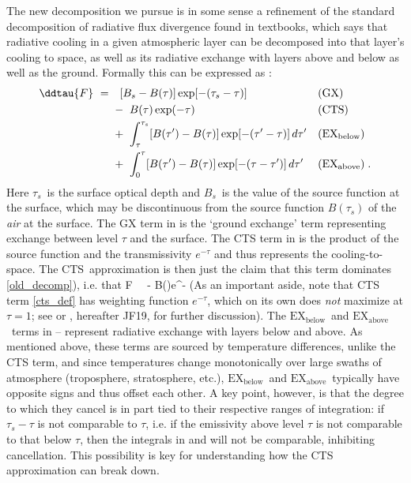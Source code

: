 \documentclass[10pt]{article}
\newcommand{\taus}{\ensuremath{\tau_s}}
\newcommand{\Bs}{\ensuremath{B_s}}
\newcommand{\CTS}{\ensuremath{\mathrm{CTS}}}
\newcommand{\EXbelow}{\ensuremath{\mathrm{EX_{below}}}}
\newcommand{\EXabove}{\ensuremath{\mathrm{EX_{above}}}}
\begin{document}
The new decomposition we pursue is in some sense a refinement of the standard decomposition of radiative flux divergence  found in textbooks, which says that radiative cooling in a given atmospheric layer can be decomposed into that layer's cooling to space, as well as its radiative exchange with layers above and below as well as the ground. Formally this can be expressed as \citep[e.g.][]{petty2006,thomas2002}:
	\begin{subequations}
	\begin{align}
			\ddtau{F} \ =\  & \ \   [\Bs-B(\tau)]\exp[-(\taus-\tau)] 
											&& \text{(GX)}  \label{gx_def} \\
								& -\  B(\tau)\exp(-\tau)
											& & \text{(CTS)} \label{cts_def} \\
								& +\ \int_\tau^{\taus} [B(\tau')-B(\tau)]\exp[-(\tau'-\tau)] \, d\tau' 
											& &(\EXbelow)  \label{exch_below}  \\
								& +\  \int_0^{\tau} [B(\tau')-B(\tau)]\exp[-(\tau-\tau')] \, d\tau'  
											& &(\EXabove) \; .  \label{exch_above} 
		\end{align}
		\label{old_decomp}
	\end{subequations}
Here \taus\ is the surface optical depth and \Bs\ is the value of the source function at the surface, which may be discontinuous from the source function $B(\taus)$ of the \emph{air} at the surface. The GX term in   is  the `ground exchange' term  representing exchange between level $\tau$ and the surface. The CTS term in  is  the product of the source function and the transmissivity $e^{-\tau}$ and thus represents the cooling-to-space. The \CTS\ approximation is then just the claim that this term dominates \eqref{old_decomp}),  i.e. that
\beqn
	\pptau F \ \approx \  - B(\tau)e^{-\tau}  \quad \quad   {} 
	\label{cts_approx}
\eeqn
(As an important aside, note that CTS term  \eqref{cts_def} has weighting function $e^{-\tau}$, which on its own does \emph{not} maximize at $\tau=1$; see \cite{huang2014} or \cite{jeevanjee2019}, hereafter JF19, for further discussion). The \EXbelow\ and \EXabove\  terms in -- represent radiative exchange  with layers below and above. As mentioned above, these terms are sourced by temperature differences, unlike the CTS term, and since temperatures change monotonically over large swaths of atmosphere (troposphere, stratosphere, etc.), \EXbelow\ and \EXabove\ typically have opposite signs and thus offset each other. A key point, however, is that the degree to which they cancel is in part tied to their respective ranges of integration: if $\taus-\tau$ is not comparable to $\tau$, i.e. if the emissivity above level $\tau$ is not comparable to that below $\tau$, then the integrals in  and  will not be comparable, inhibiting cancellation. This possibility is key for understanding how the CTS approximation can break down. 
\end{document}
